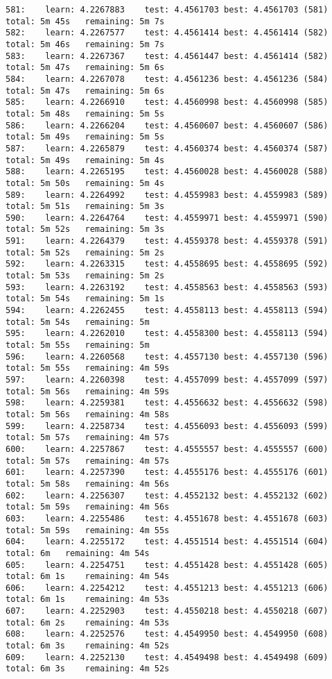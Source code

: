 \documentclass[11pt]{article}
\begin{document}
\begin{Verbatim}[commandchars=\\\{\}]
581:	learn: 4.2267883	test: 4.4561703	best: 4.4561703 (581)	total: 5m 45s	remaining: 5m 7s
582:	learn: 4.2267577	test: 4.4561414	best: 4.4561414 (582)	total: 5m 46s	remaining: 5m 7s
583:	learn: 4.2267367	test: 4.4561447	best: 4.4561414 (582)	total: 5m 47s	remaining: 5m 6s
584:	learn: 4.2267078	test: 4.4561236	best: 4.4561236 (584)	total: 5m 47s	remaining: 5m 6s
585:	learn: 4.2266910	test: 4.4560998	best: 4.4560998 (585)	total: 5m 48s	remaining: 5m 5s
586:	learn: 4.2266204	test: 4.4560607	best: 4.4560607 (586)	total: 5m 49s	remaining: 5m 5s
587:	learn: 4.2265879	test: 4.4560374	best: 4.4560374 (587)	total: 5m 49s	remaining: 5m 4s
588:	learn: 4.2265195	test: 4.4560028	best: 4.4560028 (588)	total: 5m 50s	remaining: 5m 4s
589:	learn: 4.2264992	test: 4.4559983	best: 4.4559983 (589)	total: 5m 51s	remaining: 5m 3s
590:	learn: 4.2264764	test: 4.4559971	best: 4.4559971 (590)	total: 5m 52s	remaining: 5m 3s
591:	learn: 4.2264379	test: 4.4559378	best: 4.4559378 (591)	total: 5m 52s	remaining: 5m 2s
592:	learn: 4.2263315	test: 4.4558695	best: 4.4558695 (592)	total: 5m 53s	remaining: 5m 2s
593:	learn: 4.2263192	test: 4.4558563	best: 4.4558563 (593)	total: 5m 54s	remaining: 5m 1s
594:	learn: 4.2262455	test: 4.4558113	best: 4.4558113 (594)	total: 5m 54s	remaining: 5m
595:	learn: 4.2262010	test: 4.4558300	best: 4.4558113 (594)	total: 5m 55s	remaining: 5m
596:	learn: 4.2260568	test: 4.4557130	best: 4.4557130 (596)	total: 5m 55s	remaining: 4m 59s
597:	learn: 4.2260398	test: 4.4557099	best: 4.4557099 (597)	total: 5m 56s	remaining: 4m 59s
598:	learn: 4.2259381	test: 4.4556632	best: 4.4556632 (598)	total: 5m 56s	remaining: 4m 58s
599:	learn: 4.2258734	test: 4.4556093	best: 4.4556093 (599)	total: 5m 57s	remaining: 4m 57s
600:	learn: 4.2257867	test: 4.4555557	best: 4.4555557 (600)	total: 5m 57s	remaining: 4m 57s
601:	learn: 4.2257390	test: 4.4555176	best: 4.4555176 (601)	total: 5m 58s	remaining: 4m 56s
602:	learn: 4.2256307	test: 4.4552132	best: 4.4552132 (602)	total: 5m 59s	remaining: 4m 56s
603:	learn: 4.2255486	test: 4.4551678	best: 4.4551678 (603)	total: 5m 59s	remaining: 4m 55s
604:	learn: 4.2255172	test: 4.4551514	best: 4.4551514 (604)	total: 6m	remaining: 4m 54s
605:	learn: 4.2254751	test: 4.4551428	best: 4.4551428 (605)	total: 6m 1s	remaining: 4m 54s
606:	learn: 4.2254212	test: 4.4551213	best: 4.4551213 (606)	total: 6m 1s	remaining: 4m 53s
607:	learn: 4.2252903	test: 4.4550218	best: 4.4550218 (607)	total: 6m 2s	remaining: 4m 53s
608:	learn: 4.2252576	test: 4.4549950	best: 4.4549950 (608)	total: 6m 3s	remaining: 4m 52s
609:	learn: 4.2252130	test: 4.4549498	best: 4.4549498 (609)	total: 6m 3s	remaining: 4m 52s

\end{Verbatim}
\end{document}
